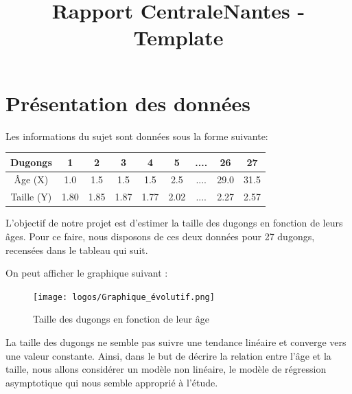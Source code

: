 \documentclass{rapportECN}
\title{Rapport CentraleNantes - Template}
\begin{document}



\fairemarges
\fairepagedegarde

\section*{Présentation des données}

Les informations du sujet sont données sous la forme suivante: 

\begin{center}
\begin{tabular}{|c|c|c|c|c|c|c|c|c|}
\hline
Dugongs & 1 & 2 & 3 & 4 & 5 & .... & 26 & 27 \\
\hline
Âge (X) & 1.0 & 1.5 & 1.5 & 1.5 & 2.5 & .... & 29.0 & 31.5 \\
\hline
Taille (Y) & 1.80 & 1.85  & 1.87 & 1.77 & 2.02 & .... & 2.27 & 2.57 \\
\hline
\end{tabular}
\end{center}

L'objectif de notre projet est d'estimer la taille des dugongs en fonction de leurs âges. Pour ce faire, nous disposons de ces deux données pour 27 dugongs, recensées dans le tableau qui suit. \newline

On peut afficher le graphique suivant : 
\begin{figure}[H]
\centering
\texttt{[image: logos/Graphique\_évolutif.png]}
\caption{Taille des dugongs en fonction de leur âge}
\end{figure}

La taille des dugongs ne semble pas suivre une tendance linéaire et converge vers une valeur constante. Ainsi, dans le but de décrire la relation entre l'âge et la taille, nous allons considérer un modèle non linéaire, le modèle de régression asymptotique qui nous semble approprié à l'étude. \newline
\end{document}
